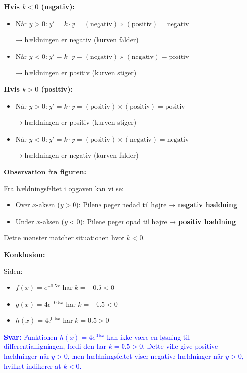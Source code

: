 \documentclass[a4paper,12pt]{article}
\begin{document}
\textbf{Hvis $k < 0$ (negativ):}
\begin{itemize}
    \item Når $y > 0$: $y' = k \cdot y = (\text{negativ}) \times (\text{positiv}) = \text{negativ}$ 
    
    → hældningen er negativ (kurven falder)
    \item Når $y < 0$: $y' = k \cdot y = (\text{negativ}) \times (\text{negativ}) = \text{positiv}$
    
    → hældningen er positiv (kurven stiger)
\end{itemize}

\textbf{Hvis $k > 0$ (positiv):}
\begin{itemize}
    \item Når $y > 0$: $y' = k \cdot y = (\text{positiv}) \times (\text{positiv}) = \text{positiv}$
    
    → hældningen er positiv (kurven stiger)
    \item Når $y < 0$: $y' = k \cdot y = (\text{positiv}) \times (\text{negativ}) = \text{negativ}$
    
    → hældningen er negativ (kurven falder)
\end{itemize}

\textbf{Observation fra figuren:}

Fra hældningsfeltet i opgaven kan vi se:
\begin{itemize}
    \item Over $x$-aksen ($y > 0$): Pilene peger nedad til højre → \textbf{negativ hældning}
    \item Under $x$-aksen ($y < 0$): Pilene peger opad til højre → \textbf{positiv hældning}
\end{itemize}

Dette mønster matcher situationen hvor $k < 0$.

\textbf{Konklusion:}

Siden:
\begin{itemize}
    \item $f(x) = e^{-0.5x}$ har $k = -0.5 < 0$ 
    \item $g(x) = 4e^{-0.5x}$ har $k = -0.5 < 0$ 
    \item $h(x) = 4e^{0.5x}$ har $k = 0.5 > 0$ 
\end{itemize}

\textcolor{blue}{\textbf{Svar:} Funktionen $h(x) = 4e^{0.5x}$ kan ikke være en løsning til differentialligningen, fordi den har $k = 0.5 > 0$. Dette ville give positive hældninger når $y > 0$, men hældningsfeltet viser negative hældninger når $y > 0$, hvilket indikerer at $k < 0$.}
\end{document}
